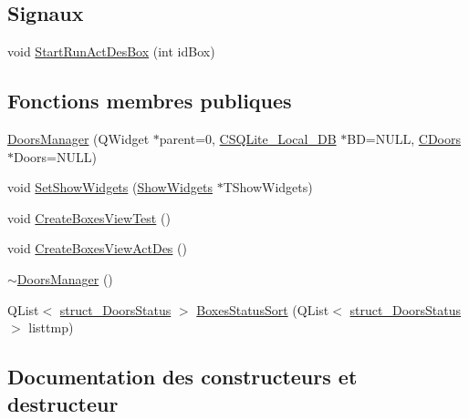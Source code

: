 \subsection*{Signaux}
\begin{DoxyCompactItemize}
\item 
void \hyperlink{class_doors_manager_a16883e6da454150c1f3778159a956750}{Start\+Run\+Act\+Des\+Box} (int id\+Box)
\end{DoxyCompactItemize}
\subsection*{Fonctions membres publiques}
\begin{DoxyCompactItemize}
\item 
\hyperlink{class_doors_manager_a3bf3ff7e7614b31422bdbdfc594e7f8e}{Doors\+Manager} (Q\+Widget $\ast$parent=0, \hyperlink{class_c_s_q_lite___local___d_b}{C\+S\+Q\+Lite\+\_\+\+Local\+\_\+\+D\+B} $\ast$B\+D=N\+U\+L\+L, \hyperlink{class_c_doors}{C\+Doors} $\ast$Doors=N\+U\+L\+L)
\item 
void \hyperlink{class_doors_manager_a900b114e04f67945be44e57804c3ad55}{Set\+Show\+Widgets} (\hyperlink{class_show_widgets}{Show\+Widgets} $\ast$T\+Show\+Widgets)
\item 
void \hyperlink{class_doors_manager_a8e1b66b56b554d177b7263cc7f6ab1e7}{Create\+Boxes\+View\+Test} ()
\item 
void \hyperlink{class_doors_manager_a20758ef57365191c3b3c6bcfcfbac90a}{Create\+Boxes\+View\+Act\+Des} ()
\item 
\hyperlink{class_doors_manager_ab3609c0a7511eac638de40b3008174d2}{$\sim$\+Doors\+Manager} ()
\item 
Q\+List$<$ \hyperlink{structstruct___doors_status}{struct\+\_\+\+Doors\+Status} $>$ \hyperlink{class_doors_manager_a34a4d157ff1632a8ec3668885134f0f0}{Boxes\+Status\+Sort} (Q\+List$<$ \hyperlink{structstruct___doors_status}{struct\+\_\+\+Doors\+Status} $>$ listtmp)
\end{DoxyCompactItemize}


\subsection{Documentation des constructeurs et destructeur}
\hypertarget{class_doors_manager_a3bf3ff7e7614b31422bdbdfc594e7f8e}{}

